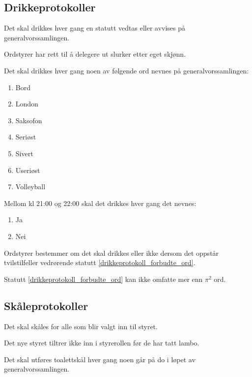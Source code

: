     \subsection{Drikkeprotokoller}
        \begin{statute}
            Det skal drikkes hver gang en statutt vedtas eller avvises på generalvorssamlingen.
        \end{statute}
        \begin{statute}
            Ordstyrer har rett til å delegere ut slurker etter eget skjønn.
        \end{statute}
        \begin{statute}[\label{drikkeprotokoll_forbudte_ord}]
            Det skal drikkes hver gang noen av følgende ord nevnes på generalvorssamlingen: 
            \begin{enumerate}
                \item Bord
                \item London
                \item Saksofon
                \item Seriøst
                \item Sivert
                \item Useriøst
                \item Volleyball
            \end{enumerate}
            Mellom kl 21:00 og 22:00 skal det drikkes hver gang det nevnes: 
            \begin{enumerate}[resume]
                \item Ja
                \item Nei
            \end{enumerate}
        \end{statute}
        \begin{statute}
            Ordstyrer bestemmer om det skal drikkes eller ikke dersom det oppstår tvilstilfeller vedrørende statutt \ref{drikkeprotokoll_forbudte_ord}.
        \end{statute}
        \begin{statute}
            Statutt \ref{drikkeprotokoll_forbudte_ord} kan ikke omfatte mer enn $\pi^2$ ord.
        \end{statute}
        
    \subsection{Skåleprotokoller}
        \begin{statute}
            Det skal skåles for alle som blir valgt inn til styret.
        \end{statute}
        \begin{statute}
            Det nye styret tiltrer ikke inn i styrerollen før de har tatt lambo.
        \end{statute}     
        \begin{statute}
            Det skal utføres toalettskål hver gang noen går på do i løpet av generalvorssamlingen.
        \end{statute}
        
